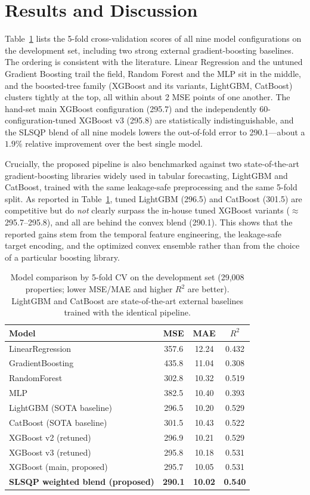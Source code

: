 \documentclass[journal]{IEEEtran}
\begin{document}
\section{Results and Discussion}
\label{sec:results}
Table~\ref{tab:cv} lists the 5-fold cross-validation scores of all nine model
configurations on the development set, including two strong external
gradient-boosting baselines. The ordering is consistent with the literature.
Linear Regression and the untuned Gradient Boosting trail the field, Random
Forest and the MLP sit in the middle, and the boosted-tree family (XGBoost and
its variants, LightGBM, CatBoost) clusters tightly at the top, all within about
2 MSE points of one another. The hand-set main XGBoost configuration (295.7)
and the independently 60-configuration-tuned XGBoost v3 (295.8) are
statistically indistinguishable, and the SLSQP blend of all nine models lowers
the out-of-fold error to 290.1---about a $1.9\%$ relative improvement over the
best single model.

Crucially, the proposed pipeline is also benchmarked against two
state-of-the-art gradient-boosting libraries widely used in tabular
forecasting, LightGBM and CatBoost, trained with the same leakage-safe
preprocessing and the same 5-fold split. As reported in Table~\ref{tab:cv},
tuned LightGBM (296.5) and CatBoost (301.5) are competitive but do \emph{not}
clearly surpass the in-house tuned XGBoost variants ($\approx$295.7--295.8),
and all are behind the convex blend (290.1). This shows that the reported
gains stem from the temporal feature engineering, the leakage-safe target
encoding, and the optimized convex ensemble rather than from the choice of a
particular boosting library.

\begin{table}[!t]
\caption{Model comparison by 5-fold CV on the development set (29{,}008
properties; lower MSE/MAE and higher $R^2$ are better). LightGBM and CatBoost
are state-of-the-art external baselines trained with the identical pipeline.}
\label{tab:cv}
\centering
\begin{tabular}{lccc}
\toprule
Model & MSE & MAE & $R^2$ \\
\midrule
LinearRegression & 357.6 & 12.24 & 0.432 \\
GradientBoosting & 435.8 & 11.04 & 0.308 \\
RandomForest & 302.8 & 10.32 & 0.519 \\
MLP & 382.5 & 10.40 & 0.393 \\
\midrule
LightGBM (SOTA baseline) & 296.5 & 10.20 & 0.529 \\
CatBoost (SOTA baseline) & 301.5 & 10.43 & 0.522 \\
XGBoost v2 (retuned) & 296.9 & 10.21 & 0.529 \\
XGBoost v3 (retuned) & 295.8 & 10.18 & 0.531 \\
XGBoost (main, proposed) & 295.7 & 10.05 & 0.531 \\
\textbf{SLSQP weighted blend (proposed)} & \textbf{290.1} & \textbf{10.02} & \textbf{0.540} \\
\bottomrule
\end{tabular}
\end{table}
\end{document}
